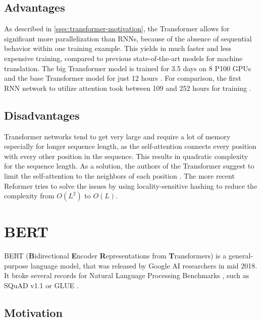 \subsection{Advantages}

As described in \cref{ssec:transformer-motivation}, the Transformer allows for significant more parallelization than RNNs, because of the absence of sequential behavior within one training example.
This yields in much faster and less expensive training, compared to previous state-of-the-art models for machine translation.
The big Transformer model is trained for 3.5 days on 8 P100 GPUs and the base Transformer model for just 12 hours \cite[p.~7]{1706.03762}. 
For comparison, the first RNN network to utilize attention took between 109 and 252 hours for training \cite[p.~14]{1409.0473}.

\subsection{Disadvantages}

Transformer networks tend to get very large and require a lot of memory especially for longer sequence length, as the self-attention connects every position with every other position in the sequence.
This results in quadratic complexity for the sequence length.
As a solution, the authors of the Transformer suggest to limit the self-attention to the neighbors of each position \cite[p.~6--7]{1706.03762}.  
The more recent Reformer \cite{kitaev2020reformer} tries to solve the issues by using locality-sensitive hashing to reduce the complexity from $O(L^2)$ to $O(L)$.


\section{BERT}\label{sec:bert}

BERT (\textbf{B}idirectional \textbf{E}ncoder \textbf{R}epresentations from \textbf{T}ransformers) is a general-purpose language model, that was released by Google AI researchers in mid 2018.
It broke several records for Natural Language Processing Benchmarks \cite[p.~5--7]{devlin2018bert}, such as  SQuAD v1.1 \cite{rajpurkar-etal-2016-squad} or GLUE \cite{1804.07461}.

\subsection{Motivation}

